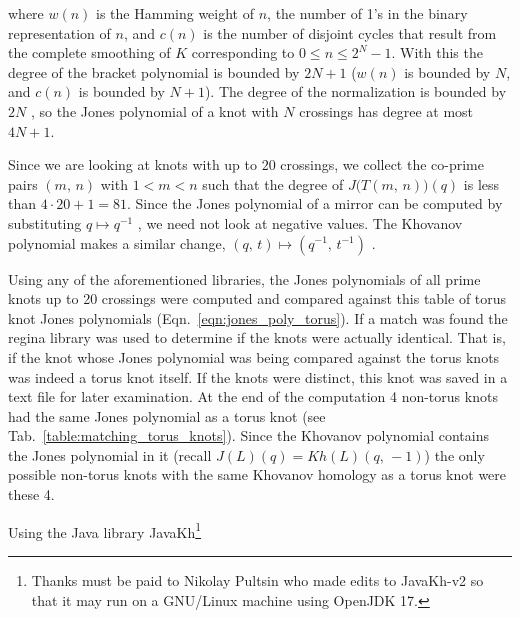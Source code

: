 \documentclass{article}
\theoremstyle{plain}
\begin{document}
        where $w(n)$ is the Hamming weight of $n$, the number of 1's in the
        binary representation of $n$, and $c(n)$ is the number of disjoint
        cycles that result from the complete smoothing of $K$ corresponding to
        $0\leq{n}\leq{2}^{N}-1$. With this the degree of the bracket polynomial
        is bounded by $2N+1$ ($w(n)$ is bounded by $N$, and $c(n)$ is bounded
        by $N+1$). The degree of the normalization is bounded by $2N$
        \cite{BarNatanKhovanovJones}, so the
        Jones polynomial of a knot with $N$ crossings has degree at most
        $4N+1$.
        \par\hfill\par
        Since we are looking at knots with up to $20$ crossings, we collect the
        co-prime pairs $(m,\,n)$ with $1<m<n$ such that the degree of
        $J\big(T(m,\,n))(q)$ is less than $4\cdot{20}+1=81$.
        Since the Jones polynomial of a mirror
        can be computed by substituting $q\mapsto{q}^{-1}$
        \cite{JonesPolyJones}, we need not look at
        negative values. The Khovanov polynomial makes a similar change,
        $(q,\,t)\mapsto(q^{-1},\,t^{-1})$
        \cite{WatsonKhovanovHomology2017}.
        \par\hfill\par
        Using any of the aforementioned libraries, the Jones polynomials of all
        prime knots up to 20 crossings were computed and compared against this
        table of torus knot Jones polynomials (Eqn.~\ref{eqn:jones_poly_torus}).
        If a match was found the regina library was used to determine if the
        knots were actually identical. That is, if the knot whose Jones
        polynomial was being compared against the torus knots was indeed a
        torus knot itself. If the knots were distinct, this knot was saved in a
        text file for later examination. At the end of the computation 4
        non-torus knots had the same Jones polynomial as a torus knot
        (see Tab.~\ref{table:matching_torus_knots}).
        Since the Khovanov polynomial contains the Jones polynomial in it
        (recall $J(L)(q)=Kh(L)(q,\,-1)$) the only possible non-torus knots with
        the same Khovanov homology as a torus knot were these 4.
        \par\hfill\par
        Using the Java library JavaKh\footnote{%
            Thanks must be paid to Nikolay Pultsin who made edits to
            JavaKh-v2 so that it may run on a GNU/Linux machine using
            OpenJDK 17.
        }
\end{document}
